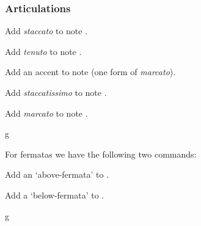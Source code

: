 \subsubsection{Articulations}\label{sec:music-notes:misc:articulations}
\begin{command}{\tmstaccato{}}
  Add \emph{staccato} to note .
\end{command}
\begin{command}{\tmtenuto{}}
  Add \emph{tenuto} to note .
\end{command}
\begin{command}{\tmaccentabove{}}
  Add an accent to note  (one form of \emph{marcato}).
\end{command}
\begin{command}{\tmstaccatissimo{}}
  Add \emph{staccatissimo} to note .
\end{command}
\begin{command}{\tmmarcato{}}
  Add \emph{marcato} to note .
\end{command}
\begin{codeexample}[]
\begin{tmline}
\begin{tmstaff}{g}{}
\end{tmstaff}
\end{tmline}
\end{codeexample}
For fermatas we have the following two commands:
\begin{command}{\tmfermata{}}
  Add an `above-fermata' to .
\end{command}
\begin{command}{\tmfermata*{}}
  Add a `below-fermata' to .
\end{command}
\begin{codeexample}[]
\begin{tmline}
\begin{tmstaff}{g}{}
\end{tmstaff}
\end{tmline}
\end{codeexample}
